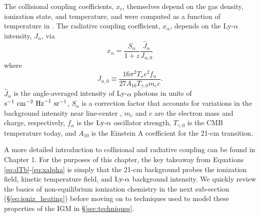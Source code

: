 The collisional coupling coefficients, $x_c$, themselves depend on the gas density, ionization state, and temperature, and were computed as a function of temperature in \cite{Zygelman2005}. The radiative coupling coefficient, $x_{\alpha}$, depends on the Ly-$\alpha$ intensity, $J_{\alpha}$, via
\begin{equation}
    x_{\alpha} = \frac{S_{\alpha}}{1+z} \frac{\hat{J}_{\alpha}}{{J}_{\alpha,0}} \label{eq:xalpha}
\end{equation}
where
\begin{equation}
    J_{\alpha,0} \equiv \frac{16\pi^2 T_{\star} e^2 f_{\alpha}}{27 A_{10} T_{\gamma,0} m_e c} . \label{eq:Jnorm}
\end{equation}
$\hat{J}_{\alpha}$ is the angle-averaged intensity of Ly-$\alpha$ photons in
units of $\text{s}^{-1} \ \text{cm}^{-2} \ \mathrm{Hz}^{-1} \ \text{sr}^{-1}$, $S_{\alpha}$ is a correction factor that
accounts for variations in the background intensity near line-center
\cite{Chen2004,FurlanettoPritchard2006,Hirata2006}, $m_e$ and $e$ are the
electron mass and charge, respectively, $f_{\alpha}$ is the $\text{Ly-}\alpha$ oscillator
strength, $T_{\gamma,0}$ is the CMB temperature today, and $A_{10}$ is the Einstein A coefficient for the 21-cm transition.

A more detailed introduction to collisional and radiative coupling can be found in Chapter 1. For the purposes of this chapter, the key takeaway from Equations \ref{eq:dTb}-\ref{eq:xalpha} is simply that the 21-cm background probes the ionization field, kinetic temperature field, and $\text{Ly-}\alpha$ background intensity. We quickly review the basics of non-equilibrium ionization chemistry in the next sub-section (\S\ref{eq:ioniz_heating}) before moving on to techniques used to model these properties of the IGM in \S\ref{sec:techniques}.


